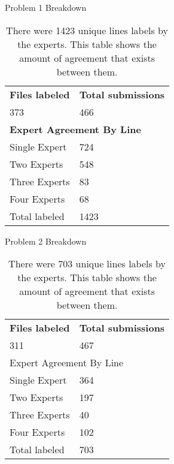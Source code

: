 \begin{table}[htbp]
\caption{Problem 1 Breakdown}
\label{expert1}
\begin{tabular}{ll}
\textbf{Files labeled}       & \textbf{Total submissions}      \\
373                 & 466                    \\
\multicolumn{2}{l}{\textbf{Expert Agreement By Line}} \\
Single Expert       & 724                    \\
Two Experts         & 548                    \\
Three Experts       & 83                     \\
Four Experts        & 68                     \\
Total labeled       & 1423                  
\end{tabular}
\caption*{There were 1423 unique lines labels by the experts. This table shows the amount of agreement that exists between them.}
\end{table}

\begin{table}[htbp]
\caption{Problem 2 Breakdown}
\label{expert2}
\begin{tabular}{ll}
\textbf{Files labeled}       & \textbf{Total submissions}      \\
311                 & 467                    \\
\multicolumn{2}{l}{Expert Agreement By Line} \\
Single Expert       & 364                    \\
Two Experts         & 197                    \\
Three Experts       & 40                     \\
Four Experts        & 102                    \\
Total labeled       & 703                   
\end{tabular}
\caption*{There were 703 unique lines labels by the experts. This table shows the amount of agreement that exists between them.}
\end{table}